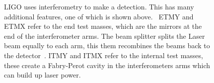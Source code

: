 \begin{figure}[hp]
    \caption[Basic layout of the \gls{LIGO} detectors.]{\gls{LIGO} uses
interferometry to make a detection. This has many additional features, one of
which is shown above.~ ETMY and ETMX refer to the
end test masses, which are the mirrors at the end of the interferometer arms.
The beam splitter splits the Laser beam equally to each arm, this them
recombines the beams back to the detector~.  ITMY and ITMX refer to the internal test masses, these create a
Fabry-Perot cavity in the interferometers arms which can build up laser
power.~ }
\label{detectors:interferometer}
\end{figure}

